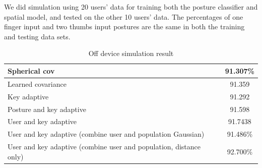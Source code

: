 \documentclass{sigchi}
\begin{document}
We did simulation using 20 users' data for training both the posture
classifier and spatial model, and tested on the other 10 users' data. The
percentages of one finger input and two thumbs input postures are the same in
both the training and testing data sets.

\begin{table}[tb]
  \centering
  \begin{tabularx}{\columnwidth}{|X|c|}
  \hline
  Spherical cov & 91.307\% \\
  \hline
  Learned covariance & 91.359 \\
  \hline
  Key adaptive  & 91.292 \\
  \hline
  Posture and key adaptive  & 91.598 \\
  \hline
  User and key adaptive & 91.7438 \\
  \hline
  User and key adaptive (combine user and population Gaussian)  & 91.486\% \\
  \hline
  User and key adaptive (combine user and population, distance only) &  92.700\%
  \\
  \hline
  \end{tabularx}
  \caption{Off device simulation result}
  \label{tab:off-device}
\end{table}
\end{document}
